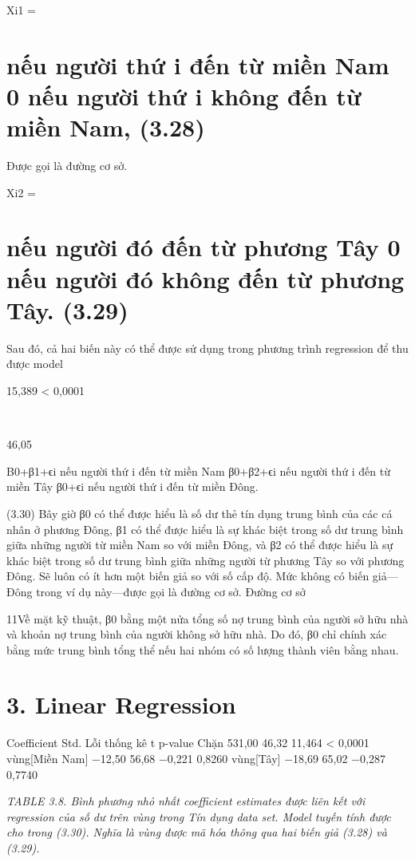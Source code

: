Xi1 =

\section{nếu người thứ i đến từ miền Nam 0 nếu người thứ i không đến từ miền Nam, (3.28)}

Được gọi là đường cơ sở.

Xi2 =

\section{nếu người đó đến từ phương Tây 0 nếu người đó không đến từ phương Tây. (3.29)}

Sau đó, cả hai biến này có thể được sử dụng trong phương trình regression để thu được model

15,389 < 0,0001

  

46,05

Β0+β1+ϵi nếu người thứ i đến từ miền Nam β0+β2+ϵi nếu người thứ i đến từ miền Tây β0+ϵi nếu người thứ i đến từ miền Đông.

(3.30) Bây giờ β0 có thể được hiểu là số dư thẻ tín dụng trung bình của các cá nhân ở phương Đông, β1 có thể được hiểu là sự khác biệt trong số dư trung bình giữa những người từ miền Nam so với miền Đông, và β2 có thể được hiểu là sự khác biệt trong số dư trung bình giữa những người từ phương Tây so với phương Đông. Sẽ luôn có ít hơn một biến giả so với số cấp độ. Mức không có biến giả—Đông trong ví dụ này—được gọi là đường cơ sở. Đường cơ sở

11Về mặt kỹ thuật, β0 bằng một nửa tổng số nợ trung bình của người sở hữu nhà và khoản nợ trung bình của người không sở hữu nhà. Do đó, β0 chỉ chính xác bằng mức trung bình tổng thể nếu hai nhóm có số lượng thành viên bằng nhau.

\section{3. Linear Regression}

Coefficient Std. Lỗi thống kê t p-value Chặn 531,00 46,32 11,464 < 0,0001 vùng[Miền Nam] −12,50 56,68 −0,221 0,8260 vùng[Tây] −18,69 65,02 −0,287 0,7740

\noindent\textit{TABLE 3.8. Bình phương nhỏ nhất coefficient estimates được liên kết với regression của số dư trên vùng trong Tín dụng data set. Model tuyến tính được cho trong (3.30). Nghĩa là vùng được mã hóa thông qua hai biến giả (3.28) và (3.29).}

